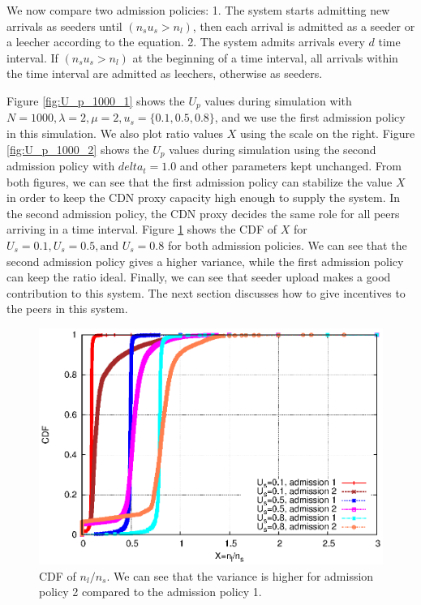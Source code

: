 \documentclass[paper]{ieice}
\begin{document}
We now compare two admission policies:
1. The system starts admitting new arrivals as seeders until $(n_su_s > n_l)$, then each arrival is admitted as a seeder or a leecher according to the equation.     
2. The system admits arrivals every $d$ time interval. If $(n_su_s > n_l)$ at the beginning of a time interval, all arrivals within the time interval are admitted as leechers, otherwise as seeders.

Figure \ref{fig:U_p_1000_1} shows the $U_p$ values during simulation
with $N=1000, \lambda=2, \mu=2, u_s=\{0.1, 0.5, 0.8\}$, and we use the
first admission policy in this simulation.  We also plot ratio values
$X$ using the scale on the right.  Figure \ref{fig:U_p_1000_2} shows
the $U_p$ values during simulation using the second admission policy
with $delta_t=1.0$ and other parameters kept unchanged.  From both
figures, we can see that the first admission policy can stabilize the
value $X$ in order to keep the CDN proxy capacity high enough to
supply the system.  In the second admission policy, the CDN proxy
decides the same role for all peers arriving in a time interval.
Figure \ref{fig:cdf} shows the CDF of $X$ for $U_s=0.1, U_s=0.5,
\text{and } U_s=0.8$ for both admission policies.  We can see that the
second admission policy gives a higher variance, while the first
admission policy can keep the ratio ideal.  Finally, we can see that
seeder upload makes a good contribution to this system.  The next
section discusses how to give incentives to the peers in this system.

\begin{figure}[hb] 
\begin{center}
\includegraphics[scale=0.6]{graphs/cdf.eps}
\end{center}
\caption{CDF of $n_l/n_s$. We can see that the variance is higher for admission policy 2 compared to the admission policy 1.}
\label{fig:cdf}
\vspace{-2mm}
\end{figure}
 
\end{document}
